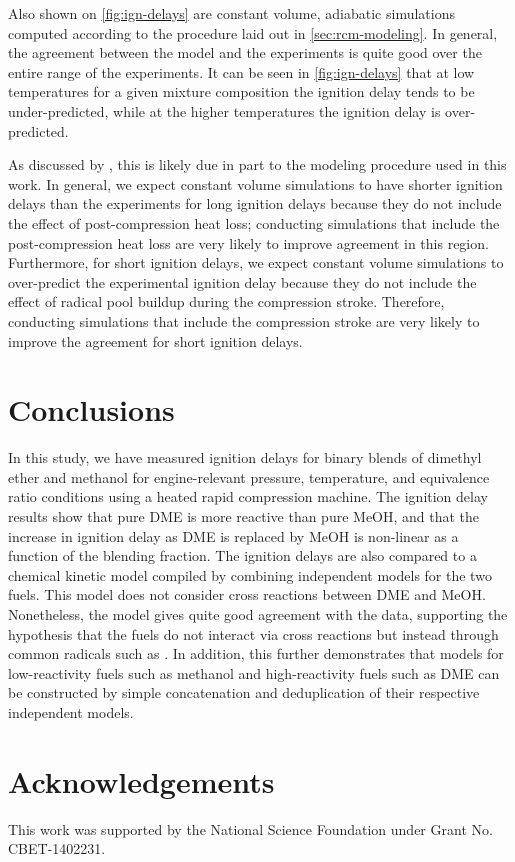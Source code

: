 \documentclass[12pt]{ussci}
\begin{document}
Also shown on \cref{fig:ign-delays} are constant volume, adiabatic simulations
computed according to the procedure laid out in \cref{sec:rcm-modeling}. In
general, the agreement between the model and the experiments is quite good over
the entire range of the experiments. It can be seen in \cref{fig:ign-delays}
that at low temperatures for a given mixture composition the ignition delay
tends to be under-predicted, while at the higher temperatures the ignition delay
is over-predicted.

As discussed by \textcite{Mittal2008}, this is likely due in part to the
modeling procedure used in this work. In general, we expect constant volume
simulations to have shorter ignition delays than the experiments for long
ignition delays because they do not include the effect of post-compression heat
loss; conducting simulations that include the post-compression heat loss are
very likely to improve agreement in this region. Furthermore, for short ignition
delays, we expect constant volume simulations to over-predict the experimental
ignition delay because they do not include the effect of radical pool buildup
during the compression stroke. Therefore, conducting simulations that include
the compression stroke are very likely to improve the agreement for short
ignition delays.

\section{Conclusions}\label{sec:conclusions}

In this study, we have measured ignition delays for binary blends of dimethyl
ether and methanol for engine-relevant pressure, temperature, and equivalence
ratio conditions using a heated rapid compression machine. The ignition delay
results show that pure DME is more reactive than pure MeOH, and that the
increase in ignition delay as DME is replaced by MeOH is non-linear as a
function of the blending fraction. The ignition delays are also compared to a
chemical kinetic model compiled by combining independent models for the two
fuels. This model does not consider cross reactions between DME and MeOH.
Nonetheless, the model gives quite good agreement with the data, supporting the
hypothesis that the fuels do not interact via cross reactions but instead
through common radicals such as . In addition, this further demonstrates
that models for low-reactivity fuels such as methanol and high-reactivity fuels
such as DME can be constructed by simple concatenation and deduplication of
their respective independent models.

\section{Acknowledgements}\label{acknowledgements}

This work was supported by the National Science Foundation under Grant No.
CBET-1402231.

\printbibliography
\end{document}
